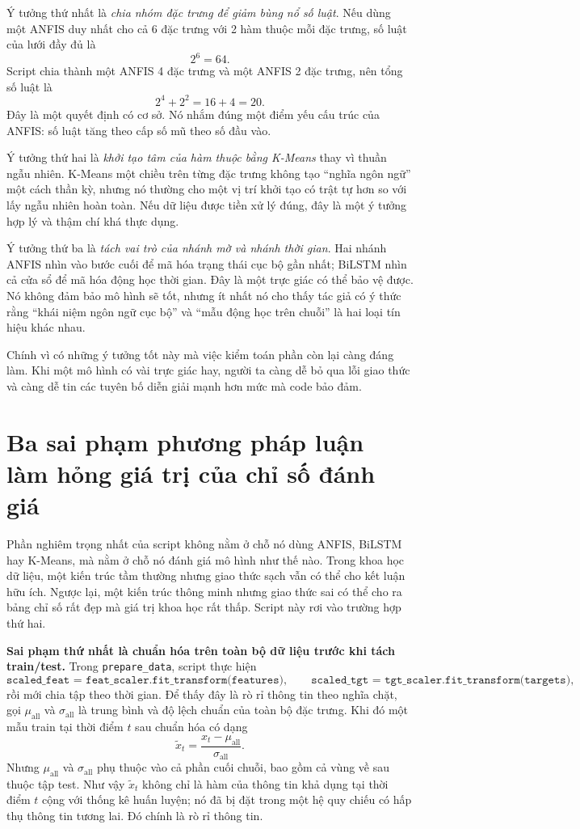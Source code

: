 Ý tưởng thứ nhất là \emph{chia nhóm đặc trưng để giảm bùng nổ số luật}. Nếu dùng một ANFIS duy nhất cho cả 6 đặc trưng với 2 hàm thuộc mỗi đặc trưng, số luật của lưới đầy đủ là
\[
2^6=64.
\]
Script chia thành một ANFIS 4 đặc trưng và một ANFIS 2 đặc trưng, nên tổng số luật là
\[
2^4+2^2=16+4=20.
\]
Đây là một quyết định có cơ sở. Nó nhắm đúng một điểm yếu cấu trúc của ANFIS: số luật tăng theo cấp số mũ theo số đầu vào.

Ý tưởng thứ hai là \emph{khởi tạo tâm của hàm thuộc bằng K-Means} thay vì thuần ngẫu nhiên. K-Means một chiều trên từng đặc trưng không tạo ``nghĩa ngôn ngữ'' một cách thần kỳ, nhưng nó thường cho một vị trí khởi tạo có trật tự hơn so với lấy ngẫu nhiên hoàn toàn. Nếu dữ liệu được tiền xử lý đúng, đây là một ý tưởng hợp lý và thậm chí khá thực dụng.

Ý tưởng thứ ba là \emph{tách vai trò của nhánh mờ và nhánh thời gian}. Hai nhánh ANFIS nhìn vào bước cuối để mã hóa trạng thái cục bộ gần nhất; BiLSTM nhìn cả cửa sổ để mã hóa động học thời gian. Đây là một trực giác có thể bảo vệ được. Nó không đảm bảo mô hình sẽ tốt, nhưng ít nhất nó cho thấy tác giả có ý thức rằng ``khái niệm ngôn ngữ cục bộ'' và ``mẫu động học trên chuỗi'' là hai loại tín hiệu khác nhau.

Chính vì có những ý tưởng tốt này mà việc kiểm toán phần còn lại càng đáng làm. Khi một mô hình có vài trực giác hay, người ta càng dễ bỏ qua lỗi giao thức và càng dễ tin các tuyên bố diễn giải mạnh hơn mức mà code bảo đảm.

\section{Ba sai phạm phương pháp luận làm hỏng giá trị của chỉ số đánh giá}

Phần nghiêm trọng nhất của script không nằm ở chỗ nó dùng ANFIS, BiLSTM hay K-Means, mà nằm ở chỗ nó đánh giá mô hình như thế nào. Trong khoa học dữ liệu, một kiến trúc tầm thường nhưng giao thức sạch vẫn có thể cho kết luận hữu ích. Ngược lại, một kiến trúc thông minh nhưng giao thức sai có thể cho ra bảng chỉ số rất đẹp mà giá trị khoa học rất thấp. Script này rơi vào trường hợp thứ hai.

\textbf{Sai phạm thứ nhất là chuẩn hóa trên toàn bộ dữ liệu trước khi tách train/test.} Trong \texttt{prepare\_data}, script thực hiện
\[
\texttt{scaled\_feat = feat\_scaler.fit\_transform(features)},
\qquad
\texttt{scaled\_tgt = tgt\_scaler.fit\_transform(targets)},
\]
rồi mới chia tập theo thời gian. Để thấy đây là rò rỉ thông tin theo nghĩa chặt, gọi \(\mu_{\mathrm{all}}\) và \(\sigma_{\mathrm{all}}\) là trung bình và độ lệch chuẩn của toàn bộ đặc trưng. Khi đó một mẫu train tại thời điểm \(t\) sau chuẩn hóa có dạng
\[
\widetilde x_t = \frac{x_t-\mu_{\mathrm{all}}}{\sigma_{\mathrm{all}}}.
\]
Nhưng \(\mu_{\mathrm{all}}\) và \(\sigma_{\mathrm{all}}\) phụ thuộc vào cả phần cuối chuỗi, bao gồm cả vùng về sau thuộc tập test. Như vậy \(\widetilde x_t\) không chỉ là hàm của thông tin khả dụng tại thời điểm \(t\) cộng với thống kê huấn luyện; nó đã bị đặt trong một hệ quy chiếu có hấp thụ thông tin tương lai. Đó chính là rò rỉ thông tin.


